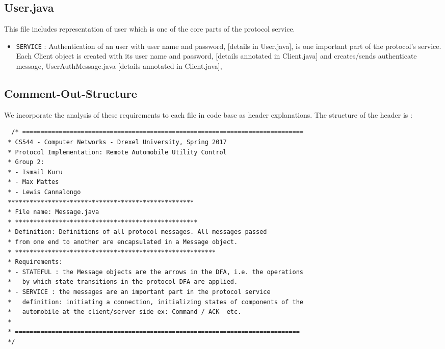 \documentclass[12pt]{usenixsubmit}
\newlength\someheight
\begin{document}
  \subsection{User.java} This file includes representation of user which is one of the core parts of the protocol service. 
  \begin{itemize}
  \item {\tt SERVICE} : Authentication of an user with user name and password, [details in User.java],  is one important part of the protocol's service. Each Client object is created with its user name and password, [details annotated in Client.java] and creates/sends authenticate message, UserAuthMessage.java [details annotated in Client.java], 
    \end{itemize}
\begin{appendices}

\section{Comment-Out-Structure}
  We incorporate the analysis of these requirements to each file in code base as header explanations. The structure of the header is :

    \begin{adjustbox}{width=\textwidth,height=\someheight,keepaspectratio}
    \begin{lstlisting}
  /* =============================================================================
 * CS544 - Computer Networks - Drexel University, Spring 2017
 * Protocol Implementation: Remote Automobile Utility Control
 * Group 2:
 * - Ismail Kuru
 * - Max Mattes
 * - Lewis Cannalongo
 ***************************************************
 * File name: Message.java
 * **************************************************
 * Definition: Definitions of all protocol messages. All messages passed
 * from one end to another are encapsulated in a Message object.
 * *******************************************************
 * Requirements:
 * - STATEFUL : the Message objects are the arrows in the DFA, i.e. the operations
 *   by which state transitions in the protocol DFA are applied.
 * - SERVICE : the messages are an important part in the protocol service
 *   definition: initiating a connection, initializing states of components of the
 *   automobile at the client/server side ex: Command / ACK  etc.
 * 
 * ==============================================================================
 */      
    \end{lstlisting}
    \end{adjustbox}




\end{appendices}
\end{document}
